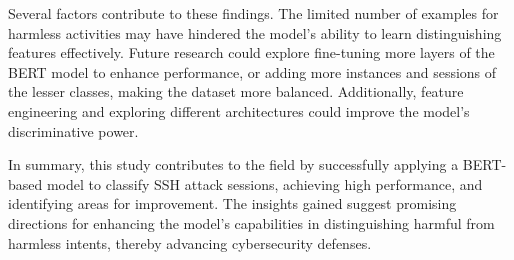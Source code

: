         Several factors contribute to these findings. The limited number of examples for harmless activities may have hindered the model's ability to learn distinguishing features effectively. Future research could explore fine-tuning more layers of the BERT model to enhance performance, or adding more instances and sessions of the lesser classes, making the dataset more balanced. Additionally, feature engineering and exploring different architectures could improve the model's discriminative power.

        In summary, this study contributes to the field by successfully applying a BERT-based model to classify SSH attack sessions, achieving high performance, and identifying areas for improvement. The insights gained suggest promising directions for enhancing the model's capabilities in distinguishing harmful from harmless intents, thereby advancing cybersecurity defenses.
